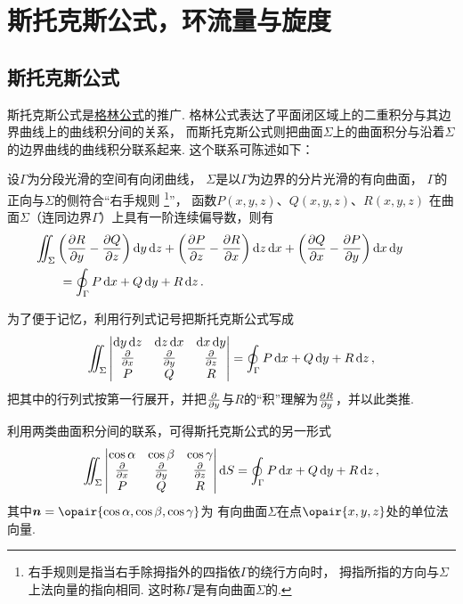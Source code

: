 \section{斯托克斯公式，环流量与旋度}
\subsection{斯托克斯公式}
斯托克斯公式是\hyperref[equation:线积分与面积分.格林公式]{格林公式}的推广.
格林公式表达了平面闭区域上的二重积分与其边界曲线上的曲线积分间的关系，
而斯托克斯公式则把曲面\(\Sigma\)上的曲面积分与沿着\(\Sigma\)的边界曲线的曲线积分联系起来.
这个联系可陈述如下：

\begin{theorem}[斯托克斯公式]
设\(\Gamma\)为分段光滑的空间有向闭曲线，
\(\Sigma\)是以\(\Gamma\)为边界的分片光滑的有向曲面，
\(\Gamma\)的正向与\(\Sigma\)的侧符合“右手规则%
\footnote{右手规则是指当右手除拇指外的四指依\(\Gamma\)的绕行方向时，
拇指所指的方向与\(\Sigma\)上法向量的指向相同.
这时称\(\Gamma\)是有向曲面\(\Sigma\)的.}”，
函数\(P(x,y,z)\)、\(Q(x,y,z)\)、\(R(x,y,z)\)
在曲面\(\Sigma\)（连同边界\(\Gamma\)）上具有一阶连续偏导数，则有
\begin{equation}\label{equation:线积分与面积分.斯托克斯公式}
	\begin{split}
		&\hspace{-20pt}\iint_\Sigma
			\left( \pdv{R}{y} - \pdv{Q}{z} \right)\dd{y}\dd{z}
			+\left( \pdv{P}{z} - \pdv{R}{x} \right)\dd{z}\dd{x}
			+\left( \pdv{Q}{x} - \pdv{P}{y} \right)\dd{x}\dd{y} \\
		&= \oint_\Gamma P\dd{x}+Q\dd{y}+R\dd{z}.
	\end{split}
\end{equation}
\end{theorem}

为了便于记忆，利用行列式记号把斯托克斯公式写成\[
	\iint_\Sigma \begin{vmatrix}
		\dd{y}\dd{z} & \dd{z}\dd{x} & \dd{x}\dd{y} \\
		\pdv{x} & \pdv{y} & \pdv{z} \\
		P & Q & R \\
	\end{vmatrix}
	= \oint_\Gamma P\dd{x}+Q\dd{y}+R\dd{z},
\]把其中的行列式按第一行展开，并把\(\pdv{y}\)与\(R\)的“积”理解为\(\pdv{R}{y}\)，并以此类推.

利用两类曲面积分间的联系，可得斯托克斯公式的另一形式\[
	\iint_\Sigma \begin{vmatrix}
		\cos\alpha & \cos\beta & \cos\gamma \\
		\pdv{x} & \pdv{y} & \pdv{z} \\
		P & Q & R \\
	\end{vmatrix} \dd{S}
	= \oint_\Gamma P\dd{x}+Q\dd{y}+R\dd{z},
\]
其中\(\mat{n}=\opair{\cos\alpha,\cos\beta,\cos\gamma}\)为
有向曲面\(\Sigma\)在点\(\opair{x,y,z}\)处的单位法向量.

